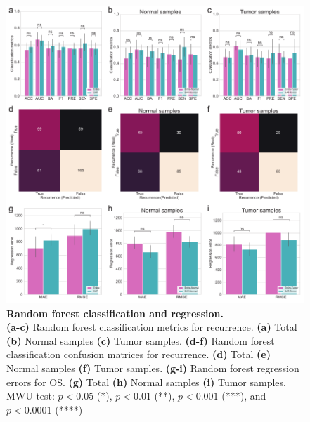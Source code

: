 \documentclass[11pt, a4paper, onecolumn, oneside]{report}
\begin{document}
            \begin{figure}[p]
                \centering
                \includegraphics[width=\linewidth]{Figures/CRC/Figure_10.pdf}
                \caption[Random forest classification and regression]{\textbf{Random forest classification and regression.}\\
                    \textbf{(a-c)} Random forest classification metrics for recurrence. \textbf{(a)} Total \textbf{(b)} Normal samples \textbf{(c)} Tumor samples. \textbf{(d-f)} Random forest classification confusion matrices for recurrence. \textbf{(d)} Total \textbf{(e)} Normal  samples \textbf{(f)} Tumor samples. \textbf{(g-i)} Random forest regression errors for OS. \textbf{(g)} Total \textbf{(h)} Normal samples \textbf{(i)} Tumor samples. MWU test: $p < 0.05$ (*), $p < 0.01$ (**), $p < 0.001$ (***), and $p < 0.0001$ (****)}
                \label{fig:CRC-ML}
            \end{figure}
            \clearpage
        \clearpage
\end{document}
